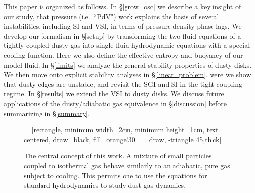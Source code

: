 \documentclass[iop, numberedappendix]{emulateapj}
\begin{document}
This paper is organized as follows. 
In \S\ref{grow_osc} 
we describe a key insight of our study, that pressure (i.e.\ ``PdV") work explains the basis of several instabilities, including SI and VSI, in terms of
pressure-density phase lags.    
We develop our formalism in \S\ref{setup} by transforming the
two fluid equations of a tightly-coupled dusty gas into single fluid
hydrodynamic equations with a special cooling function.  Here we also
define the effective entropy and buoyancy of our model fluid. 
In \S\ref{limits} we analyze the general stability properties of dusty
disks. We then move onto explicit stability analyses in
\S\ref{linear_problem}, were we show that dusty edges are unstable,
and revisit the SGI and SI in the tight
coupling regime. In \S\ref{results} we
extend the VSI to dusty disks. We   
discuss future applications of the dusty/adiabatic gas equivalence in 
\S\ref{discussion} before summarizing in \S\ref{summary}. 


\begin{figure}
 = [rectangle, minimum width=2cm, minimum height=1cm, text centered, draw=black, fill=orange!30]
   = [draw, -triangle 45,thick]  
  \begin{center}
 \end{center}
\caption{The central concept of this work. A mixture of small particles
  coupled to isothermal gas behave similarly to an adiabatic, pure gas
  subject to cooling.  This
  permits one to use the equations for standard hydrodynamics to study
  dust-gas dynamics. \label{concept_chart}}
\end{figure}
\end{document}
